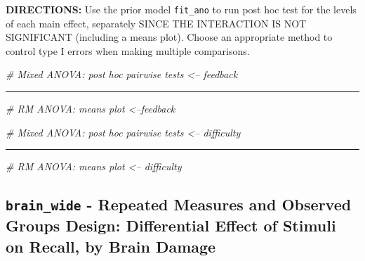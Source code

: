 \documentclass[]{article}
\newenvironment{Shaded}{\begin{snugshade}}{\end{snugshade}}
\newcommand{\CommentTok}[1]{\textcolor[rgb]{0.56,0.35,0.01}{\textit{#1}}}
\begin{document}
\textbf{DIRECTIONS:} Use the prior model \texttt{fit\_ano} to run post
hoc test for the levels of each main effect, separately SINCE THE
INTERACTION IS NOT SIGNIFICANT (including a means plot). Choose an
appropriate method to control type I errors when making multiple
comparisons.

\begin{Shaded}
\begin{Highlighting}[]
\CommentTok{# Mixed ANOVA: post hoc pairwise tests <-- feedback}
\end{Highlighting}
\end{Shaded}

\begin{center}\rule{0.5\linewidth}{\linethickness}\end{center}

\begin{Shaded}
\begin{Highlighting}[]
\CommentTok{# RM ANOVA: means plot <--feedback}
\end{Highlighting}
\end{Shaded}

\clearpage

\begin{Shaded}
\begin{Highlighting}[]
\CommentTok{# Mixed ANOVA: post hoc pairwise tests <-- difficulty}
\end{Highlighting}
\end{Shaded}

\begin{center}\rule{0.5\linewidth}{\linethickness}\end{center}

\begin{Shaded}
\begin{Highlighting}[]
\CommentTok{# RM ANOVA: means plot <-- difficulty}
\end{Highlighting}
\end{Shaded}

\clearpage

\subsection{\texorpdfstring{\texttt{brain\_wide} - Repeated Measures and
Observed Groups Design: Differential Effect of Stimuli on Recall, by
Brain
Damage}{brain\_wide - Repeated Measures and Observed Groups Design: Differential Effect of Stimuli on Recall, by Brain Damage}}\label{brain_wide---repeated-measures-and-observed-groups-design-differential-effect-of-stimuli-on-recall-by-brain-damage}
\end{document}
